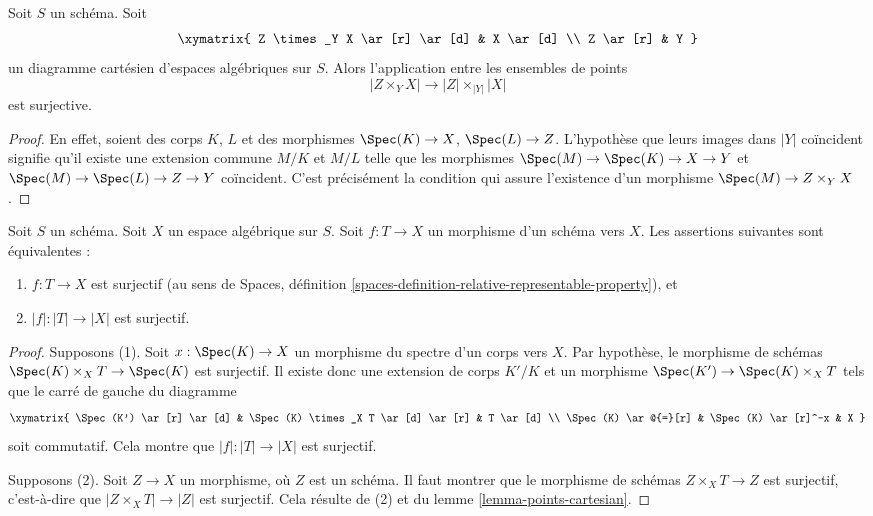 \begin{lemma}
\label{lemma-points-cartesian}
Soit $S$ un schéma. Soit
$$
\xymatrix{
Z \times_Y X \ar[r] \ar[d] & X \ar[d] \\
Z \ar[r] & Y
}
$$
un diagramme cartésien d'espaces algébriques sur $S$. Alors l'application entre les ensembles
de points
$$
|Z \times_Y X|
\longrightarrow
|Z| \times_{|Y|} |X|
$$
est surjective.
\end{lemma}

\begin{proof}
En effet, soient des corps $K$, $L$ et des morphismes
$\Spec(K) \to X$, $\Spec(L) \to Z$. L'hypothèse
que leurs images dans $|Y|$ coïncident signifie qu'il
existe une extension commune $M/K$ et $M/L$
telle que les morphismes
$\Spec(M) \to \Spec(K) \to X \to Y$ et
$\Spec(M) \to \Spec(L) \to Z \to Y$ coïncident.
C'est précisément la condition qui assure l'existence d'un
morphisme $\Spec(M) \to Z \times_Y X$.
\end{proof}

\begin{lemma}
\label{lemma-characterize-surjective}
Soit $S$ un schéma.
Soit $X$ un espace algébrique sur $S$.
Soit $f : T \to X$ un morphisme d'un schéma vers $X$.
Les assertions suivantes sont équivalentes :
\begin{enumerate}
\item $f : T \to X$ est surjectif (au sens de
Spaces, définition \ref{spaces-definition-relative-representable-property}),
et
\item $|f| : |T| \to |X|$ est surjectif.
\end{enumerate}
\end{lemma}

\begin{proof}
Supposons (1). Soit $x : \Spec(K) \to X$ un morphisme
du spectre d'un corps vers $X$. Par hypothèse, le morphisme de
schémas $\Spec(K) \times_X T \to \Spec(K)$ est surjectif.
Il existe donc une extension de corps $K'/K$ et un morphisme
$\Spec(K') \to \Spec(K) \times_X T$ tels que le carré
de gauche du diagramme
$$
\xymatrix{
\Spec(K') \ar[r] \ar[d] &
\Spec(K) \times_X T \ar[d] \ar[r] &
T \ar[d] \\
\Spec(K) \ar@{=}[r] &
\Spec(K) \ar[r]^-x & X
}
$$
soit commutatif. Cela montre que $|f| : |T| \to |X|$ est surjectif.

\medskip\noindent
Supposons (2). Soit $Z \to X$ un morphisme, où $Z$ est
un schéma. Il faut montrer que le morphisme de schémas $Z \times_X T \to Z$
est surjectif, c'est-à-dire que $|Z \times_X T| \to |Z|$ est surjectif.
Cela résulte de (2) et du
lemme \ref{lemma-points-cartesian}.
\end{proof}

